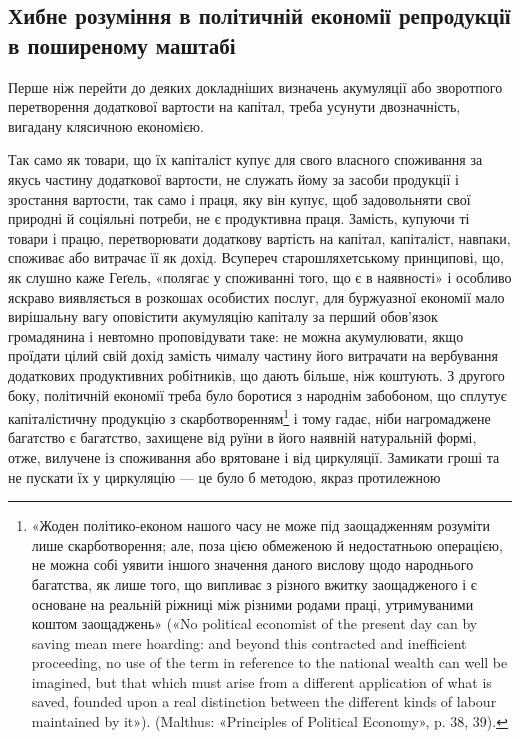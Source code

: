 \subsection{Хибне розуміння в політичній економії репродукції
в поширеному маштабі
}

Перше ніж перейти до деяких докладніших визначень акумуляції
або зворотпого перетворення додаткової вартости на капітал,
треба усунути двозначність, вигадану клясичною економією.

Так само як товари, що їх капіталіст купує для свого власного
споживання за якусь частину додаткової вартости, не служать
йому за засоби продукції і зростання вартости, так само і праця,
яку він купує, щоб задовольняти свої природні й соціяльні
потреби, не є продуктивна праця. Замість, купуючи ті товари
і працю, перетворювати додаткову вартість на капітал, капіталіст,
навпаки, споживає або витрачає її як дохід. Всупереч
старошляхетському принципові, що, як слушно каже Геґель,
«полягає у споживанні того, що є в наявності» і особливо яскраво
виявляється в розкошах особистих послуг, для буржуазної економії
мало вирішальну вагу оповістити акумуляцію капіталу за
перший обов’язок громадянина і невтомно проповідувати таке:
не можна акумулювати, якщо проїдати цілий свій дохід замість
чималу частину його витрачати на вербування додаткових продуктивних
робітників, що дають більше, ніж коштують. З другого
боку, політичній економії треба було боротися з народнім
забобоном, що сплутує капіталістичну продукцію з скарботворенням\footnote{
«Жоден політико-економ нашого часу не може під заощадженням
розуміти лише скарботворення; але, поза цією обмеженою й недостатньою
операцією, не можна собі уявити іншого значення даного
вислову щодо народнього багатства, як лише того, що випливає з різного
вжитку заощадженого і є основане на реальній ріжниці між різними
родами праці, утримуваними коштом заощаджень» («No political
economist of the present day can by saving mean mere hoarding: and
beyond this contracted and inefficient proceeding, no use of the term in reference
to the national wealth can well be imagined, but that which must
arise from a different application of what is saved, founded upon a real
distinction between the different kinds of labour maintained by it»).
(Malthus: «Principles of Political Economy», p. 38, 39).
} і тому гадає, ніби нагромаджене багатство є багатство, захищене
від руїни в його наявній натуральній формі, отже, вилучене
із споживання або врятоване і від циркуляції. Замикати гроші
та не пускати їх у циркуляцію — це було б методою, якраз протилежною
